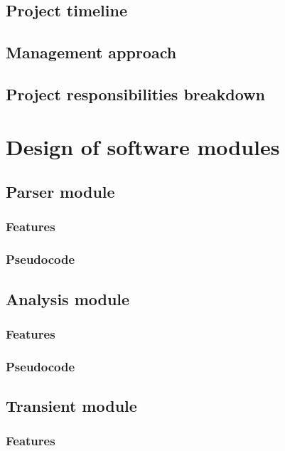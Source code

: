 \documentclass[12pt,a4paper]{article}
\begin{document}
\subsection{Project timeline}

\pagebreak

\subsection{Management approach}
\pagebreak

\subsection{Project responsibilities breakdown}
\pagebreak

\section{Design of software modules}
\pagebreak

\subsection{Parser module}
\pagebreak
\subsubsection{Features}
\pagebreak
\subsubsection{Pseudocode}
\pagebreak

\subsection{Analysis module}
\pagebreak
\subsubsection{Features}
\pagebreak
\subsubsection{Pseudocode}
\pagebreak

\subsection{Transient module}
\pagebreak
\subsubsection{Features}
\pagebreak
\end{document}
